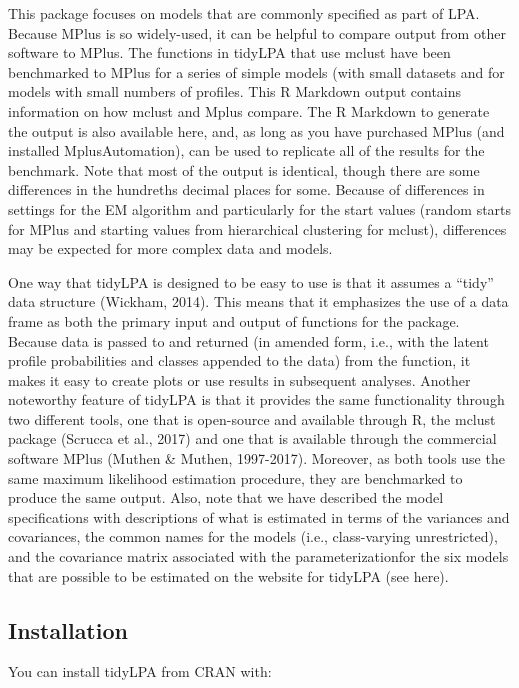\documentclass[man]{apa6}
\begin{document}
This package focuses on models that are commonly specified as part of LPA.
Because MPlus is so widely-used, it can be helpful to compare output from other
software to MPlus. The functions in tidyLPA that use mclust have been
benchmarked to MPlus for a series of simple models (with small datasets and for
models with small numbers of profiles. This R Markdown output contains
information on how mclust and Mplus compare. The R Markdown to generate the
output is also available here, and, as long as you have purchased MPlus (and
installed MplusAutomation), can be used to replicate all of the results for the
benchmark. Note that most of the output is identical, though there are some
differences in the hundreths decimal places for some. Because of differences in
settings for the EM algorithm and particularly for the start values (random
starts for MPlus and starting values from hierarchical clustering for mclust),
differences may be expected for more complex data and models.

One way that tidyLPA is designed to be easy to use is that it assumes a ``tidy''
data structure (Wickham, 2014). This means that it emphasizes the use of a data
frame as both the primary input and output of functions for the package. Because
data is passed to and returned (in amended form, i.e., with the latent profile
probabilities and classes appended to the data) from the function, it makes it
easy to create plots or use results in subsequent analyses. Another noteworthy
feature of tidyLPA is that it provides the same functionality through two
different tools, one that is open-source and available through R, the mclust
package (Scrucca et al., 2017) and one that is available through the commercial
software MPlus (Muthen \& Muthen, 1997-2017). Moreover, as both tools use the
same maximum likelihood estimation procedure, they are benchmarked to produce
the same output. Also, note that we have described the model
specifications with descriptions of what is estimated in terms of the variances
and covariances, the common names for the models (i.e., class-varying
unrestricted), and the covariance matrix associated with the parameterizationfor
the six models that are possible to be estimated on the website for tidyLPA (see
here).

\hypertarget{installation}{%
\subsection{Installation}\label{installation}}

You can install tidyLPA from CRAN with:
\end{document}
